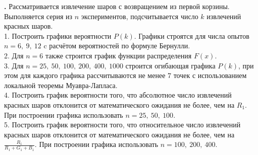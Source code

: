 \documentclass{article}
\begin{document}
\textbf {.} 
\large Рассматривается извлечение шаров с возвращением из первой корзины. Выполняется серия из \begin{math}n\end{math} экспериментов, подсчитывается число \begin{math}k\end{math} извлечений красных шаров.
\vspace{\baselineskip}
\\
\large 1. Построить графики вероятности \begin{math}P(k)\end{math}. Графики строятся для числа опытов \begin{math}n = 6,\ 9,\ 12\end{math} c расчётом вероятностей по формуле Бернулли.
\vspace{\baselineskip}
\\
\large 2. Для \begin{math}n = 6\end{math} также строится график функции распределения \begin{math}F(x)\end{math}.
\vspace{\baselineskip}
\\
\large 3. Для \begin{math}n = 25,\ 50,\ 100,\ 200,\ 400,\ 1000\end{math} строится огибающая графика \begin{math}P(k)\end{math}, при этом для каждого графика рассчитываются не менее \begin{math}7\end{math} точек с использованием локальной теоремы Муавра-Лапласа.
\vspace{\baselineskip}
\\
\large 4. Построить график вероятности того, что абсолютное число извлечений красных шаров отклонится от математического ожидания не более, чем на \begin{math}R_1\end{math}. При построении графика использовать \begin{math}n = 25,\ 50,\ 100\end{math}.
\vspace{\baselineskip}
\\
\large 5. Построить график вероятности того, что относительное число извлечений красных шаров отклонится от математического ожидания не более, чем на \begin{math}\displaystyle\frac{R_1}{R_1 + G_1 + B_1}\end{math}. При построении графика использовать \begin{math}n = 100, \ 200,\  400\end{math}.
\end{document}
